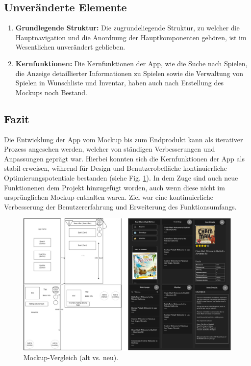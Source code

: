 \subsection{Unveränderte Elemente}
\begin{enumerate}
    \item \textbf{Grundlegende Struktur:} Die zugrundeliegende Struktur, zu welcher die Hauptnavigation und die Anordnung der Hauptkomponenten gehören, ist im Wesentlichen unverändert geblieben.
    \item \textbf{Kernfunktionen:} Die Kernfunktionen der App, wie die Suche nach Spielen, die Anzeige detaillierter Informationen zu Spielen sowie die Verwaltung von Spielen in Wunschliste und Inventar, haben auch nach Erstellung des Mockups noch Bestand.
\end{enumerate}
\subsection{Fazit}
Die Entwicklung der App vom Mockup bis zum Endprodukt kann als iterativer Prozess angesehen werden, welcher
von ständigen Verbesserungen und Anpassungen geprägt war. Hierbei konnten sich die Kernfunktionen der App
als stabil erweisen, während für Design und Benutzerobefläche kontinuierliche Optimierungspotentiale bestanden (siehe Fig. \ref{fig:optimierung}).
In dem Zuge sind auch neue Funktionenen dem Projekt hinzugefügt worden, auch wenn diese nicht im ursprünglichen
Mockup enthalten waren. Ziel war eine kontinuierliche Verbesserung der Benutzererfahrung und Erweiterung des Funktionsumfangs.
\begin{figure}[H]
    \centering
    \includegraphics[width=1\textwidth]{graphics/mockup_vergleich.png}
    \caption{Mockup-Vergleich (alt vs. neu).}
    \label{fig:optimierung}
\end{figure}